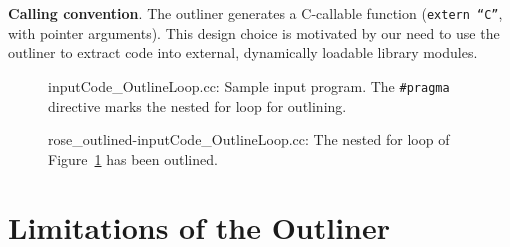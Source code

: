 \textbf{Calling convention}. The outliner generates a C-callable
function (\texttt{extern ``C''}, with pointer arguments). This design
choice is motivated by our need to use the outliner to extract code
into external, dynamically loadable library modules.

\begin{figure}[!b]
{\indent
{\mySmallFontSize
\begin{latexonly}
   
\end{latexonly}
\begin{htmlonly}
   
\end{htmlonly}

}
}
\caption{inputCode\_OutlineLoop.cc: Sample input program. The \texttt{\#pragma} directive marks the nested for loop for outlining.}
\label{fig:Outliner:input1}
\end{figure}

\begin{figure}[!h]
{\indent
{\mySmallFontSize
\begin{latexonly}
   
\end{latexonly}
\begin{htmlonly}
   
\end{htmlonly}

}
}
\caption{rose\_outlined-inputCode\_OutlineLoop.cc: The nested for loop of Figure~\ref{fig:Outliner:input1} has been outlined.}
\label{fig:Outliner:output1}
\end{figure}

\section{Limitations of the Outliner}
\label{sec:Outliner:limits}

